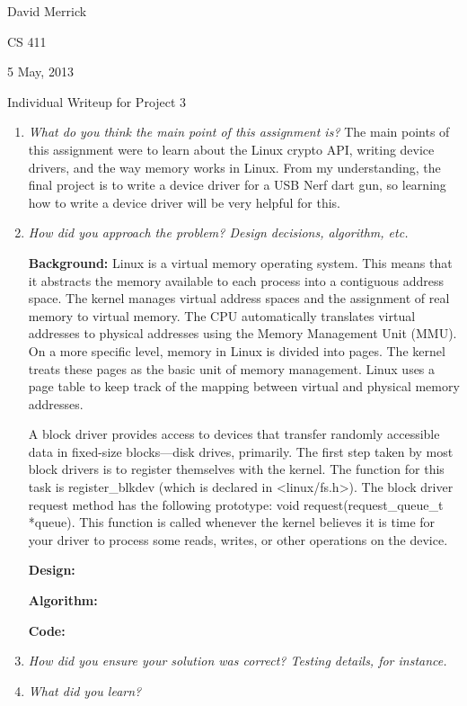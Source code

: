 \documentclass[letterpaper,10pt,titlepage]{article}
\newcommand{\ignore}[2]{\hspace{0in}#2} %
\newcommand{\tab}{\hspace*{2em}} %
\def\name{David Merrick}
\def\project{Project 3}
\def\date{5 May, 2013}
\begin{document}
\name

CS 411

\date

\begin{center}
{\LARGE Individual Writeup for \project}
\end{center}

\begin{enumerate} 
\item \emph{What do you think the main point of this assignment is?}
The main points of this assignment were to learn about the Linux crypto API, writing device drivers, and the way memory works in Linux. From my understanding, the final project is to write a device driver for a USB Nerf dart gun, so learning how to write a device driver will be very helpful for this.

\item \emph{How did you approach the problem? Design decisions, algorithm, etc.}

\tab \textbf{Background:} 
\tab Linux is a virtual memory operating system. This means that it abstracts the memory available to each process into a contiguous address space. The kernel manages virtual address spaces and the assignment of real memory to virtual memory. The CPU automatically translates virtual addresses to physical addresses using the Memory Management Unit (MMU)\ignore{source:http://en.wikipedia.org/wiki/Virtual_memory}. On a more specific level, memory in Linux is divided into pages. The kernel treats these pages as the basic unit of memory management\ignore{source:Love pg. 231}. Linux uses a page table to keep track of the mapping between virtual and physical memory addresses.

\tab A block driver provides access to devices that transfer randomly accessible data in fixed-size blocks—disk drives, primarily. The first step taken by most block drivers is to register themselves with the kernel. The function for this task is register\_blkdev (which is declared in <linux/fs.h>). The block driver request method has the following prototype: void request(request_queue_t *queue). This function is called whenever the kernel believes it is time for your driver to process some reads, writes, or other operations on the device\ignore{source: http://lwn.net/images/pdf/LDD3/ch16.pdf}. 

\tab \textbf{Design:} 

\tab \textbf{Algorithm:} 

\tab \textbf{Code:}

\item \emph{How did you ensure your solution was correct? Testing details, for instance.}

\item \emph{What did you learn?}

\end{enumerate}

%
\end{document}
